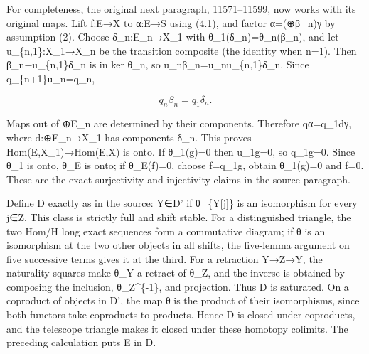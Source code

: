For completeness,\allowbreak{} the original next paragraph,\allowbreak{} 11571–\allowbreak{}11599,\allowbreak{} now works with its original maps. Lift f:\allowbreak{}E\allowbreak{}→X to α:\allowbreak{}E\allowbreak{}→S using (4.1)\allowbreak{},\allowbreak{} and factor α\allowbreak{}=(\allowbreak{}⊕β\_\allowbreak{}n)\allowbreak{}γ by assumption (2)\allowbreak{}. Choose δ\_\allowbreak{}n:\allowbreak{}E\_\allowbreak{}n\allowbreak{}→X\_\allowbreak{}1 with θ\_\allowbreak{}1(δ\_\allowbreak{}n)\allowbreak{}\allowbreak{}=θ\_\allowbreak{}n(β\_\allowbreak{}n)\allowbreak{},\allowbreak{} and let u\_\allowbreak{}\{n,\allowbreak{}1\}:\allowbreak{}X\_\allowbreak{}1\allowbreak{}→X\_\allowbreak{}n be the transition composite (the identity when n\allowbreak{}=1)\allowbreak{}. Then β\_\allowbreak{}n−u\_\allowbreak{}\{n,\allowbreak{}1\}δ\_\allowbreak{}n is in ker θ\_\allowbreak{}n,\allowbreak{} so u\_\allowbreak{}nβ\_\allowbreak{}n\allowbreak{}=u\_\allowbreak{}nu\_\allowbreak{}\{n,\allowbreak{}1\}δ\_\allowbreak{}n. Since q\_\allowbreak{}\{n\allowbreak{}+1\}u\_\allowbreak{}n\allowbreak{}=q\_\allowbreak{}n,\allowbreak{}

\[
 q_n\beta_n=q_1\delta_n.
\]

Maps out of \allowbreak{}⊕E\_\allowbreak{}n are determined by their components. Therefore qα\allowbreak{}=q\_\allowbreak{}1dγ,\allowbreak{} where d:\allowbreak{}\allowbreak{}⊕E\_\allowbreak{}n\allowbreak{}→X\_\allowbreak{}1 has components δ\_\allowbreak{}n. This proves Hom(E,\allowbreak{}X\_\allowbreak{}1)\allowbreak{}\allowbreak{}→Hom(E,\allowbreak{}X)\allowbreak{} is onto. If θ\_\allowbreak{}1(g)\allowbreak{}\allowbreak{}=0 then u\_\allowbreak{}1g\allowbreak{}=0,\allowbreak{} so q\_\allowbreak{}1g\allowbreak{}=0. Since θ\_\allowbreak{}1 is onto,\allowbreak{} θ\_\allowbreak{}E is onto; if θ\_\allowbreak{}E(f)\allowbreak{}\allowbreak{}=0,\allowbreak{} choose f\allowbreak{}=q\_\allowbreak{}1g,\allowbreak{} obtain θ\_\allowbreak{}1(g)\allowbreak{}\allowbreak{}=0 and f\allowbreak{}=0. These are the exact surjectivity and injectivity claims in the source paragraph.

Define D\textquotesingle{} exactly as in the source:\allowbreak{} Y\allowbreak{}∈D' if θ\_\allowbreak{}\{Y[j]\allowbreak{}\} is an isomorphism for every j\allowbreak{}∈Z. This class is strictly full and shift stable. For a distinguished triangle,\allowbreak{} the two Hom/\allowbreak{}H long exact sequences form a commutative diagram; if θ is an isomorphism at the two other objects in all shifts,\allowbreak{} the five-lemma argument on five successive terms gives it at the third. For a retraction Y\allowbreak{}→Z\allowbreak{}→Y,\allowbreak{} the naturality squares make θ\_\allowbreak{}Y a retract of θ\_\allowbreak{}Z,\allowbreak{} and the inverse is obtained by composing the inclusion,\allowbreak{} θ\_\allowbreak{}Z\textasciicircum{}\{-1\},\allowbreak{} and projection. Thus D\textquotesingle{} is saturated. On a coproduct of objects in D',\allowbreak{} the map θ is the product of their isomorphisms,\allowbreak{} since both functors take coproducts to products. Hence D\textquotesingle{} is closed under coproducts,\allowbreak{} and the telescope triangle makes it closed under these homotopy colimits. The preceding calculation puts E in D\textquotesingle.

